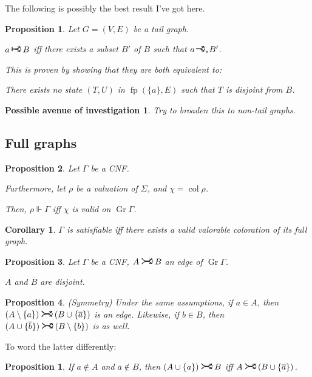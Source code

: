 \documentclass[11pt]{article}
\newcommand{\conj}[1]{\overline{#1}}
\newcommand{\sat}{\Vdash}
\DeclareMathOperator{\Gr}{Gr}
\DeclareMathOperator{\col}{col}
\DeclareMathOperator{\fp}{fp}
\newcommand{\rightcurvearrow}{
\mathrel{
  \begin{tikzpicture}[scale=0.8]
    \draw[thick,->] (0,1ex) arc (30:150:-2ex);
    \draw[thick,->] (0,-1ex) arc (150:30:2ex);
  \end{tikzpicture}
}
}
\newcommand{\rightcurveor}{
\!
\mathrel{
  \begin{tikzpicture}[scale=0.8]
    \draw[thick,->] (0,0) arc (90:150:-2ex);
    \draw[thick,->] (0,0) arc (90:30:2ex);
    \draw[thick] (-1ex, 0) -- (0.1ex,0);
  \end{tikzpicture}
}\!
}
\newcommand{\Rightcurveor}{
\mathrel{
  \begin{tikzpicture}[scale=0.8]
    \draw[thick,->] (0,0) arc (90:150:-2ex);
    \draw[thick,->] (0,0) arc (90:30:2ex);
    \draw[thick] (-1ex, 0) -- (0.1ex,0);
    \draw[thick] (-1ex, -0.7ex) -- (-1ex, 0.7ex);
  \end{tikzpicture}
}
}
\newtheorem{prop}{Proposition}
\newtheorem*{prop*}{Proposition}
\newtheorem{corollary}{Corollary}
\newtheorem*{av}{Possible avenue of investigation}
\begin{document}
The following is possibly the best result I've got here.

\begin{prop}
Let $G = (V,E)$ be a tail graph.

$a \Rightcurveor B$ iff there exists a subset $B'$ of $B$ such that $a \rightcurveor_* B'$.

This is proven by showing that they are both equivalent to:

There exists no state $(T,U)$ in $\fp (\{a\}, E)$ such that $T$ is disjoint from $B$.
\end{prop}

\begin{av}
Try to broaden this to non-tail graphs.
\end{av}

\subsection{Full graphs}

\begin{prop}
Let $\Gamma$ be a CNF.

Furthermore, let $\rho$ be a valuation of $\Sigma$, and $\chi = \col \rho$.

Then, $\rho \sat \Gamma$ iff $\chi$ is valid on $\Gr \Gamma$.
\end{prop}

\begin{corollary}
$\Gamma$ is satisfiable iff there exists a valid valorable coloration of its full graph.
\end{corollary}

\begin{prop}
Let $\Gamma$ be a CNF, ${A \rightcurvearrow B}$ an edge of $\Gr \Gamma$.

$A$ and $\conj B$ are disjoint.
\end{prop}

\begin{prop} (Symmetry)
Under the same assumptions, if ${a \in A}$, then ${(A \setminus \{a\}) \rightcurvearrow (B \cup \{\conj a \})}$ is an edge. Likewise, if ${b \in B}$, then ${(A \cup \{\conj b\}) \rightcurvearrow (B \setminus \{b\})}$ is as well.
\end{prop}

To word the latter differently:

\begin{prop*}
If $a \not\in A$ and $\conj a \not\in B$, then $(A \cup \{a\}) \rightcurvearrow B$ iff $A \rightcurvearrow (B \cup \{\conj a\})$.
\end{prop*}
\end{document}
